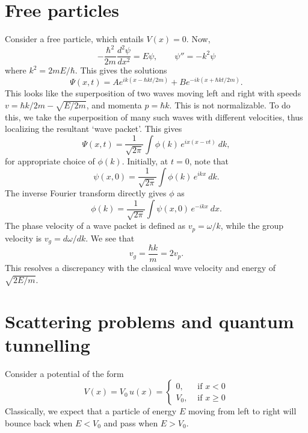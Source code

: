 \documentclass[11pt]{article}
\newcommand\dd[3][]{\frac{d^{#1}{#2}}{d {#3}^{#1}}}
\theoremstyle{definition}
\theoremstyle{remark}
\numberwithin{equation}{section}
\begin{document}
    \section{Free particles}
    Consider a free particle, which entails $V(x) = 0$. Now, \[
        -\frac{\hbar^2}{2m}\dd[2]{\psi}{x} = E \psi, \qquad 
        \psi'' = -k^2\psi
    \] where $k^2 = 2mE / \hbar$. This gives the solutions \[
        \Psi(x, t) = Ae^{ik(x - \hbar kt / 2m)} + Be^{-ik(x + \hbar kt / 2m)}.
    \] This looks like the superposition of two waves moving left and right with
    speeds $v = \hbar k / 2m - \sqrt{E / 2m}$, and momenta $p = \hbar k$.
    This is not normalizable. To do this, we take the superposition of many such
    waves with different velocities, thus localizing the resultant `wave packet'.
    This gives \[
        \Psi(x, t) = \frac{1}{\sqrt{2\pi}} \int \phi(k)\, e^{ix(x - vt)}\:dk,
    \] for appropriate choice of $\phi(k)$. Initially, at $t = 0$, note that \[
        \psi(x, 0) = \frac{1}{\sqrt{2\pi}} \int \phi(k)\, e^{ikx}\:dk.
    \] The inverse Fourier transform directly gives $\phi$ as \[
        \phi(k) = \frac{1}{\sqrt{2\pi}} \int \psi(x, 0)\, e^{-ikx}\:dx.
    \] The phase velocity of a wave packet is defined as $v_p =\omega /k$, while the
    group velocity is $v_g = d\omega / dk$. We see that \[
        v_g = \frac{\hbar k}{m} = 2v_p.
    \] This resolves a discrepancy with the classical wave velocity and energy of
    $\sqrt{2E / m}$.

    \section{Scattering problems and quantum tunnelling}
    Consider a potential of the form \[
        V(x) = V_0\, u(x) = \begin{cases}
            0, &\text{ if }x < 0 \\
            V_0, &\text{ if } x \geq 0
        \end{cases}
    \] Classically, we expect that a particle of energy $E$ moving from left to
    right will bounce back when $E < V_0$ and pass when $E > V_0$. 
\end{document}
